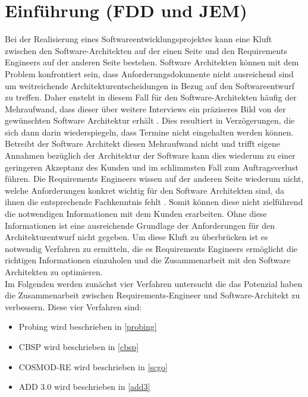 \section{Einf\"uhrung (FDD und JEM)}
Bei der Realisierung eines Softwareentwicklungsprojektes kann eine Kluft zwischen den Software-Architekten auf der einen Seite und den Requirements Engineers auf der anderen Seite bestehen. Software Architekten können mit dem Problem konfrontiert sein, dass Anforderungsdokumente nicht ausreichend sind um weitreichende Architekturentscheidungen in Bezug auf den Softwareentwurf zu treffen. Daher ensteht in diesem Fall für den Software-Architekten häufig der Mehraufwand, dass dieser über weitere Interviews ein präziseres Bild von der gewünschten Software Architektur erhält \cite{probing}. Dies resultiert in Verzögerungen, die sich dann darin wiederspiegeln, dass Termine nicht eingehalten werden können. Betreibt der Software Architekt diesen Mehraufwand nicht und trifft eigene Annahmen bezüglich der Architektur der Software \cite{probing} kann dies wiederum zu einer geringeren Akzeptanz des Kunden und im schlimmsten Fall zum Auftragsverlust führen. Die Requirements Engineers wissen auf der anderen Seite wiederum nicht, welche Anforderungen konkret wichtig für den Software Architekten sind, da ihnen die entsprechende Fachkenntnis fehlt \cite{probing}. Somit können diese nicht zielführend die notwendigen Informationen mit dem Kunden erarbeiten. Ohne diese Informationen ist eine ausreichende Grundlage der Anforderungen für den Architekturentwurf nicht gegeben. Um diese Kluft zu überbrücken ist es notwendig Verfahren zu ermitteln, die es Requirements Engineers ermöglicht die richtigen Informationen einzuholen und die Zusammenarbeit mit den Software Architekten zu optimieren.\\

Im Folgenden werden zunächst vier Verfahren untersucht die das Potenzial haben die Zusammenarbeit zwischen Requirements-Engineer und Software-Architekt zu verbessern. Diese vier Verfahren sind:\\

\begin{itemize}
\item Probing wird beschrieben in \ref{probing}
\item CBSP wird beschrieben in \ref{cbsp}
\item COSMOD-RE wird beschrieben in \ref{scgo}
\item ADD 3.0 wird beschrieben in \ref{add3}\\
\end{itemize}

